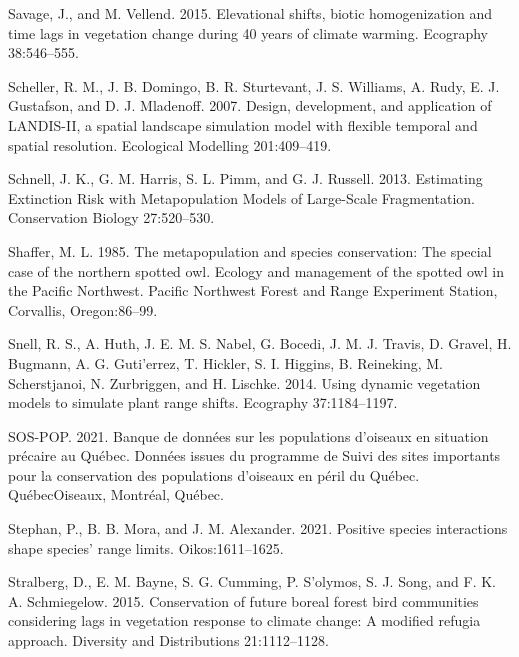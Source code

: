 \documentclass[12pt]{article}
\newlength{\cslhangindent}
\newenvironment{cslreferences}%
  {\setlength{\parindent}{0pt}%
  \everypar{\setlength{\hangindent}{\cslhangindent}}\ignorespaces}%
  {\par}
\begin{document}
\begin{cslreferences}
\leavevmode\hypertarget{ref-savage_elevational_2015}{}%
Savage, J., and M. Vellend. 2015. Elevational shifts, biotic
homogenization and time lags in vegetation change during 40 years of
climate warming. Ecography 38:546--555.

\leavevmode\hypertarget{ref-scheller_design_2007}{}%
Scheller, R. M., J. B. Domingo, B. R. Sturtevant, J. S. Williams, A.
Rudy, E. J. Gustafson, and D. J. Mladenoff. 2007. Design, development,
and application of LANDIS-II, a spatial landscape simulation model with
flexible temporal and spatial resolution. Ecological Modelling
201:409--419.

\leavevmode\hypertarget{ref-schnell_estimating_2013}{}%
Schnell, J. K., G. M. Harris, S. L. Pimm, and G. J. Russell. 2013.
Estimating Extinction Risk with Metapopulation Models of Large-Scale
Fragmentation. Conservation Biology 27:520--530.

\leavevmode\hypertarget{ref-shaffer_metapopulation_1985}{}%
Shaffer, M. L. 1985. The metapopulation and species conservation: The
special case of the northern spotted owl. Ecology and management of the
spotted owl in the Pacific Northwest. Pacific Northwest Forest and Range
Experiment Station, Corvallis, Oregon:86--99.

\leavevmode\hypertarget{ref-snell_using_2014}{}%
Snell, R. S., A. Huth, J. E. M. S. Nabel, G. Bocedi, J. M. J. Travis, D.
Gravel, H. Bugmann, A. G. Guti\a'errez, T. Hickler, S. I. Higgins, B.
Reineking, M. Scherstjanoi, N. Zurbriggen, and H. Lischke. 2014. Using
dynamic vegetation models to simulate plant range shifts. Ecography
37:1184--1197.

\leavevmode\hypertarget{ref-sos-pop_banque_2021}{}%
SOS-POP. 2021. Banque de données sur les populations d'oiseaux en
situation précaire au Québec. Données issues du programme de Suivi des
sites importants pour la conservation des populations d'oiseaux en péril
du Québec. QuébecOiseaux, Montréal, Québec.

\leavevmode\hypertarget{ref-stephan_positive_2021}{}%
Stephan, P., B. B. Mora, and J. M. Alexander. 2021. Positive species
interactions shape species' range limits. Oikos:1611--1625.

\leavevmode\hypertarget{ref-stralberg_conservation_2015}{}%
Stralberg, D., E. M. Bayne, S. G. Cumming, P. S\a'olymos, S. J. Song,
and F. K. A. Schmiegelow. 2015. Conservation of future boreal forest
bird communities considering lags in vegetation response to climate
change: A modified refugia approach. Diversity and Distributions
21:1112--1128.


\end{cslreferences}
\end{document}
